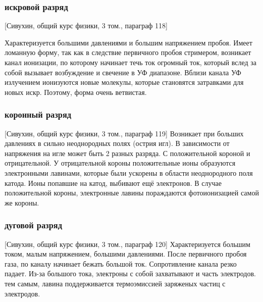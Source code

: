 \documentclass[10pt, a4paper]{article}
\numberwithin{equation}{section}
\begin{document}
\subsubsection{искровой разряд}
[Сивухин, общий курс физики, 3 том., параграф 118]

Характеризуется большими давлениями и большим напряжением пробоя.
Имеет ломанную форму, так как в следствие первичного пробоя стримером, возникает канал ионизации, по которому начинает течь ток огромный ток, который вслед за собой вызывает возбуждение и свечение в УФ диапазоне. Вблизи канала УФ излучением ионизуются новые молекулы, которые становятся затравками для новых искр. Поэтому, форма очень ветвистая.

\subsubsection{коронный разряд}
[Сивухин, общий курс физики, 3 том., параграф 119]
Возникает при больших давлениях в сильно неоднородных полях (острия игл). В зависимости от напряжения на игле может быть 2 разных разряда. С положительной короной и отрицательной.
У отрицательной короны положительные ионы образуются электронными лавинами, которые были ускорены в области неоднородного поля катода. Ионы попавшие на катод, выбивают ещё электронов.
В случае положительной короны,  электронные лавины пораждаются фотоионизацией самой же короны.

\subsubsection{дуговой разряд}
[Сивухин, общий курс физики, 3 том., параграф 120]
Характеризуется большим током, малым напряжением, большими давлениями.
После первичного пробоя газа, по каналу начинает бежать большой ток. Сопротивление канала резко падает. Из-за большого тока, электроны с собой захватывают и часть электродов. тем самым, лавина поддерживается термоэмиссией заряженых частиц с электродов.
\end{document}
